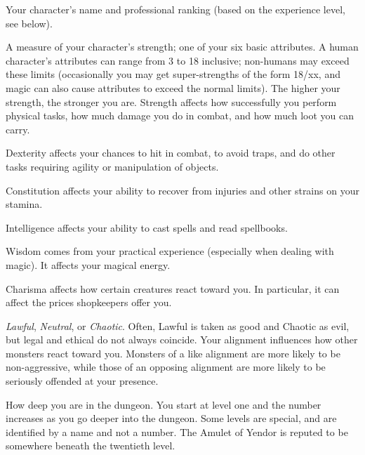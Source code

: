 \item[\bb{Rank}]
Your character's name and professional ranking (based on the
experience level, see below).

\item[\bb{Strength}]
A measure of your character's strength; one of your six basic
attributes.  A human character's attributes can range from 3 to 18 inclusive;
non-humans may exceed these limits
(occasionally you may get super-strengths of the form 18/xx, and magic can
also cause attributes to exceed the normal limits).  The
higher your strength, the stronger you are.  Strength affects how
successfully you perform physical tasks, how much damage you do in
combat, and how much loot you can carry.

\item[\bb{Dexterity}]
Dexterity affects your chances to hit in combat, to avoid traps, and
do other tasks requiring agility or manipulation of objects.

\item[\bb{Constitution}]
Constitution affects your ability to recover from injuries and other
strains on your stamina.

\item[\bb{Intelligence}]
Intelligence affects your ability to cast spells and read spellbooks.

\item[\bb{Wisdom}]
Wisdom comes from your practical experience (especially when dealing with
magic).  It affects your magical energy.

\item[\bb{Charisma}]
Charisma affects how certain creatures react toward you.  In
particular, it can affect the prices shopkeepers offer you.

\item[\bb{Alignment}]
{\it Lawful}, {\it Neutral}, or {\it Chaotic}.  Often, Lawful is
taken as good and Chaotic as evil, but legal and ethical do not always
coincide.  Your alignment influences how other
monsters react toward you.  Monsters of a like alignment are more likely
to be non-aggressive, while those of an opposing alignment are more likely
to be seriously offended at your presence.

\item[\bb{Dungeon Level}]
How deep you are in the dungeon.  You start at level one and the number
increases as you go deeper into the dungeon.  Some levels are special,
and are identified by a name and not a number.  The Amulet of Yendor is
reputed to be somewhere beneath the twentieth level.

